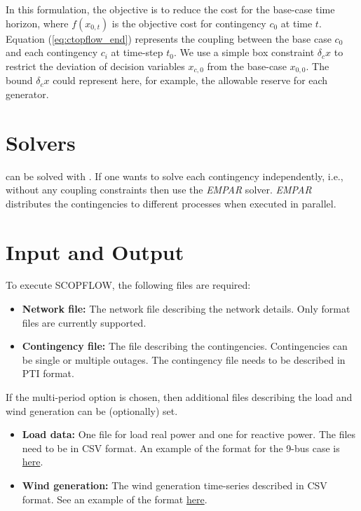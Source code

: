 In this formulation, the objective is to reduce the cost for the base-case time horizon, where $f(x_{0,t})$ is the objective cost for contingency $c_0$ at time $t$. Equation (\ref{eq:ctopflow_end}) represents the coupling between the base case $c_0$ and each contingency $c_i$ at time-step $t_0$. We use a simple box constraint $\delta_c{x}$ to restrict the  deviation of decision variables $x_{c,0}$ from the base-case $x_{0,0}$. The bound $\delta_c{x}$ could represent here, for example, the allowable reserve for each generator.

\section{Solvers}
\scopflow can be solved with \ipopt. If one wants to solve each contingency independently, i.e., without any coupling constraints then use  the \emph{EMPAR} solver. \emph{EMPAR} distributes the contingencies to different processes when executed in parallel.

\section{Input and Output}
To execute SCOPFLOW, the following files are required:
\begin{itemize}
    \item \textbf{Network file:} The network file describing the network details. Only \matpower format files are currently supported.
    \item \textbf{Contingency file:} The file describing the contingencies. Contingencies can be single or multiple outages. The contingency file needs to be described in PTI format.
\end{itemize}
If the multi-period option is chosen, then additional files describing the load and wind generation can be (optionally) set.
\begin{itemize}
    \item \textbf{Load data:} One file for load real power and one for reactive power. The files need to be in CSV format. An example of the format for the 9-bus case is \href{https://gitlab.pnnl.gov/exasgd/frameworks/exago/-/tree/master/datafiles/case9}{here}.
    \item \textbf{Wind generation:} The wind generation time-series described in CSV format. See an example of the format \href{https://gitlab.pnnl.gov/exasgd/frameworks/exago/-/tree/master/datafiles/case9}{here}.
\end{itemize}

